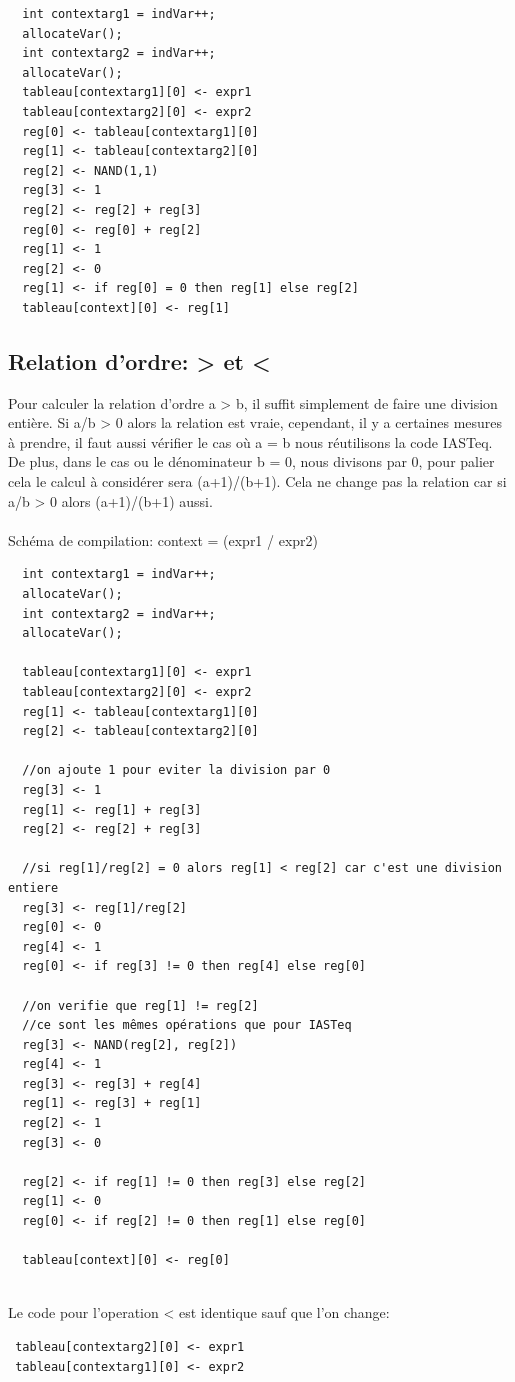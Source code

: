 \documentclass[a4paper,12pt]{report}
\begin{document}
\begin{verbatim}
  int contextarg1 = indVar++;
  allocateVar();
  int contextarg2 = indVar++;
  allocateVar();
  tableau[contextarg1][0] <- expr1
  tableau[contextarg2][0] <- expr2
  reg[0] <- tableau[contextarg1][0]
  reg[1] <- tableau[contextarg2][0]
  reg[2] <- NAND(1,1)
  reg[3] <- 1
  reg[2] <- reg[2] + reg[3]
  reg[0] <- reg[0] + reg[2]
  reg[1] <- 1
  reg[2] <- 0
  reg[1] <- if reg[0] = 0 then reg[1] else reg[2]
  tableau[context][0] <- reg[1]
\end{verbatim}

\subsection{Relation d'ordre: > et <}
Pour calculer la relation d'ordre a > b, il suffit simplement de faire une division entière.
Si a/b > 0 alors la relation est vraie, cependant, il y a certaines mesures à prendre,
il faut aussi vérifier le cas où a = b nous réutilisons la code IASTeq. De plus, dans le cas ou le dénominateur b = 0, nous divisons
par 0, pour palier cela le calcul à considérer sera (a+1)/(b+1). Cela ne change pas la relation car si a/b > 0 alors (a+1)/(b+1) aussi.
\\ \\
Schéma de compilation: context = (expr1 / expr2)
\begin{verbatim}
  int contextarg1 = indVar++;
  allocateVar();
  int contextarg2 = indVar++;
  allocateVar();
  
  tableau[contextarg1][0] <- expr1
  tableau[contextarg2][0] <- expr2
  reg[1] <- tableau[contextarg1][0]
  reg[2] <- tableau[contextarg2][0]
    
  //on ajoute 1 pour eviter la division par 0
  reg[3] <- 1
  reg[1] <- reg[1] + reg[3]
  reg[2] <- reg[2] + reg[3]
    
  //si reg[1]/reg[2] = 0 alors reg[1] < reg[2] car c'est une division entiere
  reg[3] <- reg[1]/reg[2]
  reg[0] <- 0
  reg[4] <- 1
  reg[0] <- if reg[3] != 0 then reg[4] else reg[0]
    
  //on verifie que reg[1] != reg[2]
  //ce sont les mêmes opérations que pour IASTeq
  reg[3] <- NAND(reg[2], reg[2])
  reg[4] <- 1
  reg[3] <- reg[3] + reg[4]
  reg[1] <- reg[3] + reg[1]
  reg[2] <- 1
  reg[3] <- 0
  
  reg[2] <- if reg[1] != 0 then reg[3] else reg[2]
  reg[1] <- 0
  reg[0] <- if reg[2] != 0 then reg[1] else reg[0]
    
  tableau[context][0] <- reg[0]
		
\end{verbatim}
Le code pour l'operation < est identique sauf que l'on change:
\begin{verbatim}
 tableau[contextarg2][0] <- expr1
 tableau[contextarg1][0] <- expr2
\end{verbatim}
\end{document}
